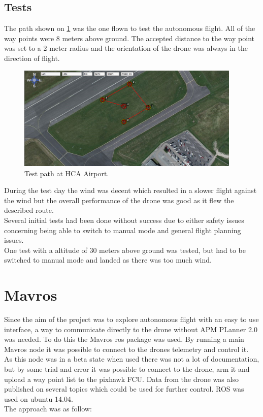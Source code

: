  
\subsection{Tests}
The path shown on \ref{fig:HCAPath} was the one flown to test the autonomous flight. All of the way
points were 8 meters above ground. The accepted distance to the way point was set to a 2 meter
radius and the orientation of the drone was always in the direction of flight.

\begin{figure}[H]
  \centering
    \includegraphics[width=0.95\textwidth]{./Images/HCAPath}
  \caption{Test path at HCA Airport.}
  \label{fig:HCAPath}
\end{figure}

During the test day the wind was decent which resulted in a slower flight against the wind but the
overall performance of the drone was good as it flew the described route. \\

Several initial tests had been done without success due to either safety issues concerning being
able to switch to manual mode and general flight planning issues.\\

One test with a altitude of 30 meters above ground was tested, but had to be switched to manual mode
and landed as there was too much wind.\\
 
\section{Mavros}
Since the aim of the project was to explore autonomous flight with an easy to use interface, a way
to communicate directly to the drone without APM PLanner 2.0 was needed. To do this the Mavros
\cite{Ref:Mavros} ros package was used. By running a main Mavros node it was possible to connect to
the drones telemetry and control it.\\
As this node was in a beta state when used there was not a lot of documentation, but by some trial
and error it was possible to connect to the drone, arm it and upload a way point list to the pixhawk
FCU. Data from the drone was also published on several topics which could be used for further
control. ROS was used on ubuntu 14.04.\\
The approach was as follow:

